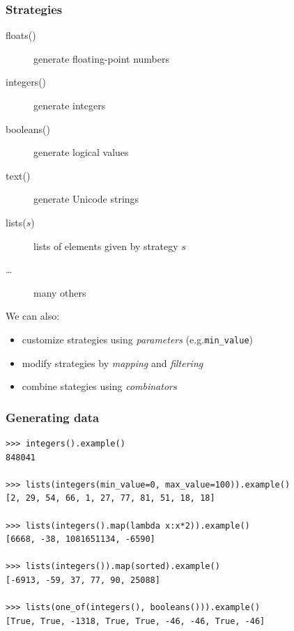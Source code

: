\documentclass{beamer}
\begin{document}
\begin{frame}
  \frametitle{Strategies}

  \begin{description}
    \item[floats()] generate floating-point numbers
  \item[integers()] generate integers
  \item[booleans()] generate logical values 
  \item[text()] generate Unicode strings
  \item[lists($s$)] lists of elements given by strategy $s$
    \item[\ldots] many others
  \end{description}
  \bigskip
  
  We can also:
  \begin{itemize}
  \item customize strategies using \emph{parameters} (e.g.\@ \texttt{min\_value})
  \item modify strategies by \emph{mapping} and \emph{filtering}
  \item combine stategies using \emph{combinators}
  \end{itemize} 
\end{frame}

\begin{frame}[fragile]
  \frametitle{Generating data}

\begin{verbatim}
>>> integers().example()
848041

>>> lists(integers(min_value=0, max_value=100)).example()
[2, 29, 54, 66, 1, 27, 77, 81, 51, 18, 18]

>>> lists(integers().map(lambda x:x*2)).example()
[6668, -38, 1081651134, -6590]

>>> lists(integers()).map(sorted).example()
[-6913, -59, 37, 77, 90, 25088]

>>> lists(one_of(integers(), booleans())).example()
[True, True, -1318, True, True, -46, -46, True, -46]
\end{verbatim}
\end{frame}
\end{document}
